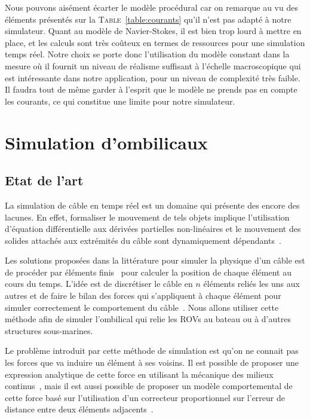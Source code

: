 				Nous pouvons aisément écarter le modèle procédural car on remarque au vu des éléments présentés sur la \textsc{Table}~\ref{table:courants} qu'il n'est pas adapté à notre simulateur. Quant au modèle de Navier-Stokes, il est bien trop lourd à mettre en place, et les calculs sont très coûteux en termes de ressources pour une simulation temps réel. Notre choix se porte donc l'utilisation du modèle constant dans la mesure où il fournit un niveau de réalisme suffisant à l'échelle macroscopique qui est intéressante dans notre application, pour un niveau de complexité très faible. Il faudra tout de même garder à l'esprit que le modèle ne prends pas en compte les courants, ce qui constitue une limite pour notre simulateur.

		\section{Simulation d'ombilicaux}

			\subsection{Etat de l'art}

				La simulation de câble en temps réel est un domaine qui présente des encore des lacunes. En effet, formaliser le mouvement de tels objets implique l'utilisation d'équation différentielle aux dérivées partielles non-linéaires et le mouvement des solides attachés aux extrémités du câble sont dynamiquement dépendants~\cite{blintsov_development_2017}.

				Les solutions proposées dans la littérature pour simuler la physique d'un câble est de procéder par éléments finis~\cite{bender_simulation_methods} pour calculer la position de chaque élément au cours du temps. L'idée est de discrétiser le câble en $n$ éléments reliés les uns aux autres et de faire le bilan des forces qui s'appliquent à chaque élément pour simuler correctement le comportement du câble~\cite{ellis_modeling, blintsov_development_2017,marshall,ganoni_unreal, koenemann_modeling_2017, prabhakar_dynamics_2005}. Nous allons utiliser cette méthode afin de simuler l'ombilical qui relie les \gls{ROV}s au bateau ou à d'autres structures sous-marines.

				Le problème introduit par cette méthode de simulation est qu'on ne connait pas les forces que va induire un élément à ses voisins. Il est possible de proposer une expression analytique de cette force en utilisant la mécanique des milieux continus~\cite{koenemann_modeling_2017, prabhakar_dynamics_2005}, mais il est aussi possible de proposer un modèle comportemental de cette force basé sur l'utilisation d'un correcteur proportionnel sur l'erreur de distance entre deux éléments adjacents~\cite{ellis_modeling,ganoni_unreal,blintsov_development_2017}.

